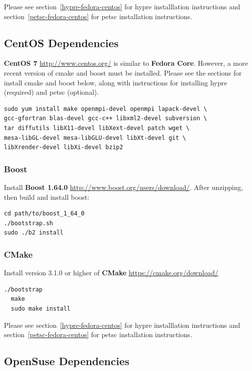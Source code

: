 \documentclass[12pt]{article}
\begin{document}
Please see section~\ref{hypre-fedora-centos} for hypre installlation
instructions and section~\ref{petsc-fedora-centos} for petsc installation instructions.



\subsection{CentOS  Dependencies}

\textbf{CentOS 7} \url{http://www.centos.org/} is similar to \textbf{Fedora
Core}.  However, a more recent version of cmake and boost must be installed. 
Please see the sections for install cmake and boost below, along with 
instructions for installing hypre (required) and petsc (optional).

\begin{verbatim}
sudo yum install make openmpi-devel openmpi lapack-devel \
gcc-gfortran blas-devel gcc-c++ libxml2-devel subversion \ 
tar diffutils libX11-devel libXext-devel patch wget \
mesa-libGL-devel mesa-libGLU-devel libXt-devel git \
libXrender-devel libXi-devel bzip2
\end{verbatim} 

\subsubsection{Boost}

Install \textbf{Boost 1.64.0} \url{http://www.boost.org/users/download/}.
After unzipping, then build and install boost:

\begin{verbatim}
cd path/to/boost_1_64_0
./bootstrap.sh
sudo ./b2 install
\end{verbatim}



\subsubsection{CMake}
Install version 3.1.0 or higher of \textbf{CMake} \url{https://cmake.org/download/}

\begin{verbatim}
./bootstrap
  make
  sudo make install
\end{verbatim}

Please see section~\ref{hypre-fedora-centos} for hypre installlation
instructions and section~\ref{petsc-fedora-centos} for petsc installation instructions.


\subsection{OpenSuse  Dependencies}
\end{document}
